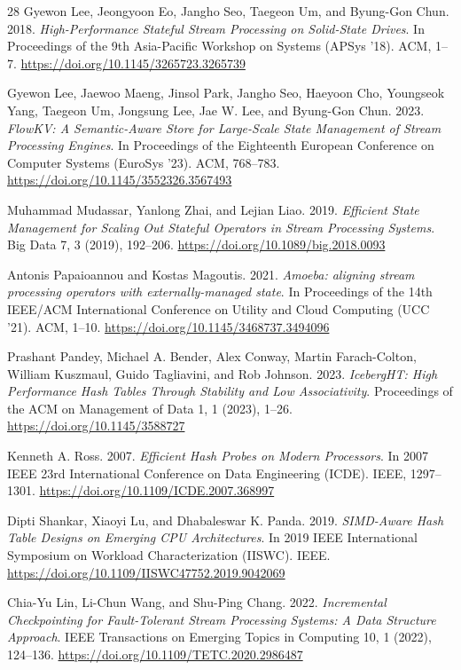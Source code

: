 \documentclass[sigconf]{acmart}
\begin{document}
\begin{thebibliography}{28}
Gyewon Lee, Jeongyoon Eo, Jangho Seo, Taegeon Um, and Byung-Gon Chun.
2018.
\textit{High-Performance Stateful Stream Processing on Solid-State Drives}.
In Proceedings of the 9th Asia-Pacific Workshop on Systems (APSys '18). ACM, 1--7.
\url{https://doi.org/10.1145/3265723.3265739}

Gyewon Lee, Jaewoo Maeng, Jinsol Park, Jangho Seo, Haeyoon Cho, Youngseok Yang, Taegeon Um, Jongsung Lee, Jae W. Lee, and Byung-Gon Chun.
2023.
\textit{FlowKV: A Semantic-Aware Store for Large-Scale State Management of Stream Processing Engines}.
In Proceedings of the Eighteenth European Conference on Computer Systems (EuroSys '23). ACM, 768--783.
\url{https://doi.org/10.1145/3552326.3567493}

Muhammad Mudassar, Yanlong Zhai, and Lejian Liao.
2019.
\textit{Efficient State Management for Scaling Out Stateful Operators in Stream Processing Systems}.
Big Data 7, 3 (2019), 192--206.
\url{https://doi.org/10.1089/big.2018.0093}

Antonis Papaioannou and Kostas Magoutis.
2021.
\textit{Amoeba: aligning stream processing operators with externally-managed state}.
In Proceedings of the 14th IEEE/ACM International Conference on Utility and Cloud Computing (UCC '21). ACM, 1--10.
\url{https://doi.org/10.1145/3468737.3494096}

Prashant Pandey, Michael A. Bender, Alex Conway, Martin Farach-Colton, William Kuszmaul, Guido Tagliavini, and Rob Johnson.
2023.
\textit{IcebergHT: High Performance Hash Tables Through Stability and Low Associativity}.
Proceedings of the ACM on Management of Data 1, 1 (2023), 1--26.
\url{https://doi.org/10.1145/3588727}

Kenneth A. Ross.
2007.
\textit{Efficient Hash Probes on Modern Processors}.
In 2007 IEEE 23rd International Conference on Data Engineering (ICDE). IEEE, 1297--1301.
\url{https://doi.org/10.1109/ICDE.2007.368997}

Dipti Shankar, Xiaoyi Lu, and Dhabaleswar K. Panda.
2019.
\textit{SIMD-Aware Hash Table Designs on Emerging CPU Architectures}.
In 2019 IEEE International Symposium on Workload Characterization (IISWC). IEEE.
\url{https://doi.org/10.1109/IISWC47752.2019.9042069}

Chia-Yu Lin, Li-Chun Wang, and Shu-Ping Chang.
2022.
\textit{Incremental Checkpointing for Fault-Tolerant Stream Processing Systems: A Data Structure Approach}.
IEEE Transactions on Emerging Topics in Computing 10, 1 (2022), 124--136.
\url{https://doi.org/10.1109/TETC.2020.2986487}


\end{thebibliography}
\end{document}
